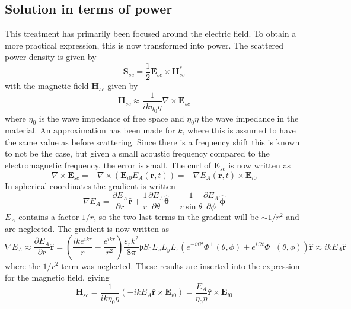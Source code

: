\documentclass[10pt,a4paper]{eitExjobb}
\begin{document}
	\subsection{Solution in terms of power}
	This treatment has primarily been focused around the electric field. To obtain a more practical expression, this is now transformed into power. The scattered power density is given by
	\begin{equation*}
	\bm{S}_{sc} = \frac{1}{2} \bm{E}_{sc} \times \bm{H}_{sc}^*
	\end{equation*}
	with the magnetic field $\bm{H}_{sc}$ given by
	\begin{equation*}
	\bm{H}_{sc} \approx \frac{1}{ik \eta_0 \eta} \nabla \times \bm{E}_{sc}
	\end{equation*}
	where $\eta_0$ is the wave impedance of free space and $\eta_0 \eta$ the wave impedance in the material. An approximation has been made for $k$, where this is assumed to have the same value as before scattering. Since there is a frequency shift this is known to not be the case, but given a small acoustic frequency compared to the electromagnetic frequency, the error is small. The curl of $\bm{E}_{sc}$ is now written as
	\begin{equation*}
	\nabla \times \bm{E}_{sc} = -\nabla \times (\bm{E}_{i0} E_A (\bm{r},t)) = -\nabla E_A (\bm{r},t) \times \bm{E}_{i0}
	\end{equation*}
	In spherical coordinates the gradient is written
	\begin{equation*}
	\nabla E_A = \frac{\partial E_A}{\partial r} \bm{\hat{r}} + \frac{1}{r} \frac{\partial E_A}{\partial \theta} \bm{\hat{\theta}} + \frac{1}{r\sin{\theta}} \frac{\partial E_A}{\partial \phi} \bm{\hat{\phi}}
	\end{equation*}
	$E_A$ contains a factor $1/r$, so the two last terms in the gradient will be $\sim 1/r^2$ and are neglected. The gradient is now written as
	\begin{equation*}
	\nabla E_A \approx \frac{\partial E_A}{\partial r} \bm{\hat{r}} = \left( \frac{ike^{ikr}}{r} - \frac{e^{ikr}}{r^2} \right) \frac{\varepsilon_r k^2}{8\pi} \mathfrak{p} S_0 L_x L_y L_z \left( e^{- i\Omega t} \Phi^+ (\theta,\phi) + e^{ i\Omega t} \Phi^- (\theta,\phi) \right) \bm{\hat{r}} \approx ikE_A \bm{\hat{r}}
	\end{equation*}
	where the $1/r^2$ term was neglected. These results are inserted into the expression for the magnetic field, giving
	\begin{equation*}
	\bm{H}_{sc} = \frac{1}{ik \eta_0 \eta} (-ikE_A \bm{\hat{r}} \times \bm{E}_{i0}) = \frac{E_A}{ \eta_0 \eta} \bm{\hat{r}} \times \bm{E}_{i0}
	\end{equation*}
\end{document}
